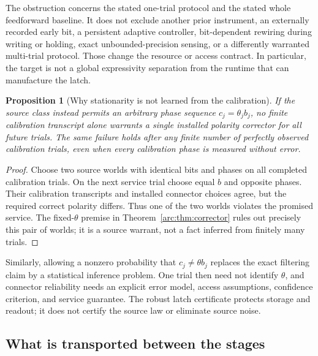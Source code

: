 \documentclass[11pt]{article}
\newtheorem{proposition}[theorem]{Proposition}
\theoremstyle{definition}
\theoremstyle{remark}
\begin{document}
The obstruction concerns the stated one-trial protocol and the stated
whole feedforward baseline. It does not exclude another prior instrument,
an externally recorded early bit, a persistent adaptive controller,
bit-dependent rewiring during writing or holding, exact unbounded-precision
sensing, or a differently warranted multi-trial protocol. Those change the
resource or access contract. In particular, the target is not a global
expressivity separation from the runtime that can manufacture the latch.

\begin{proposition}[Why stationarity is not learned from the calibration]
\label{arc:prop:stationarity}
If the source class instead permits an arbitrary phase sequence
$c_j=\theta_j b_j$, no finite calibration transcript alone warrants a
single installed polarity corrector for all future trials. The same
failure holds after any finite number of perfectly observed calibration
trials, even when every calibration phase is measured without error.
\end{proposition}
\begin{proof}
Choose two source worlds with identical bits and phases on all completed
calibration trials. On the next service trial choose equal $b$ and
opposite phases. Their calibration transcripts and installed connector
choices agree, but the required correct polarity differs. Thus one of
the two worlds violates the promised service. The fixed-$\theta$ premise
in Theorem~\ref{arc:thm:corrector} rules out precisely this pair of worlds;
it is a source warrant, not a fact inferred from finitely many trials.
\end{proof}

Similarly, allowing a nonzero probability that $c_j\ne\theta b_j$ replaces
the exact filtering claim by a statistical inference problem. One trial
then need not identify $\theta$, and connector reliability needs an
explicit error model, access assumptions, confidence criterion, and
service guarantee. The robust latch certificate protects storage and
readout; it does not certify the source law or eliminate source noise.

\subsection{What is transported between the stages}
\end{document}
